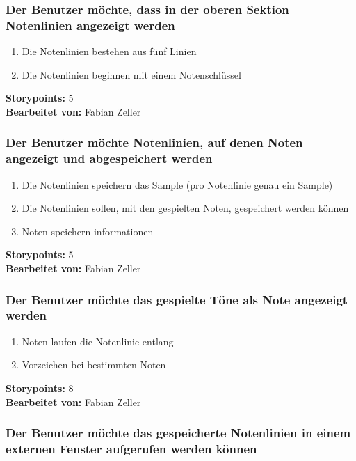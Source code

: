 \subsubsection{Der Benutzer möchte, dass in der oberen Sektion Notenlinien angezeigt werden}

\begin{enumerate}
 \item Die Notenlinien bestehen aus fünf Linien
 \item Die Notenlinien beginnen mit einem Notenschlüssel
\end{enumerate}

\textbf{Storypoints:} 5 \\
\textbf{Bearbeitet von: } Fabian Zeller \\


\subsubsection{Der Benutzer möchte Notenlinien, auf denen Noten angezeigt und abgespeichert werden}

\begin{enumerate}
 \item Die Notenlinien speichern das Sample (pro Notenlinie genau ein Sample)
 \item Die Notenlinien sollen, mit den gespielten Noten, gespeichert werden können
 \item Noten speichern informationen
\end{enumerate}

\textbf{Storypoints:} 5 \\
\textbf{Bearbeitet von: } Fabian Zeller \\


\subsubsection{Der Benutzer möchte das gespielte Töne als Note angezeigt werden}

\begin{enumerate}
 \item Noten laufen die Notenlinie entlang
 \item Vorzeichen bei bestimmten Noten
\end{enumerate}

\textbf{Storypoints:} 8 \\
\textbf{Bearbeitet von: } Fabian Zeller \\


\subsubsection{Der Benutzer möchte das gespeicherte Notenlinien in einem externen Fenster aufgerufen 
werden können}

